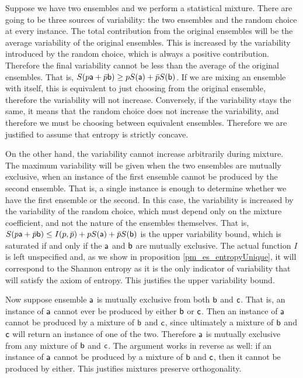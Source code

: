 \begin{mathSection}
\begin{justification}
	Suppose we have two ensembles and we perform a statistical mixture. There are going to be three sources of variability: the two ensembles and the random choice at every instance. The total contribution from the original ensembles will be the average variability of the original ensembles. This is increased by the variability introduced by the random choice, which is always a positive contribution. Therefore the final variability cannot be less than the average of the original ensembles. That is, $S(p\ens[a] + \bar{p} \ens[b]) \geq p S(\ens[a]) + \bar{p} S(\ens[b])$. If we are mixing an ensemble with itself, this is equivalent to just choosing from the original ensemble, therefore the variability will not increase. Conversely, if the variability stays the same, it means that the random choice does not increase the variability, and therefore we must be choosing between equivalent ensembles. Therefore we are justified to assume that entropy is strictly concave.
	
	On the other hand, the variability cannot increase arbitrarily during mixture. The maximum variability will be given when the two ensembles are mutually exclusive, when an instance of the first ensemble cannot be produced by the second ensemble. That is, a single instance is enough to determine whether we have the first ensemble or the second. In this case, the variability is increased by the variability of the random choice, which must depend only on the mixture coefficient, and not the nature of the ensembles themselves. That is, $S(p\ens[a] + \bar{p} \ens[b]) \leq I(p, \bar{p}) + p S(\ens[a]) + \bar{p} S(\ens[b])$ is the upper variability bound, which is saturated if and only if the $\ens[a]$ and $\ens[b]$ are mutually exclusive. The actual function $I$ is left unspecified and, as we show in proposition \ref{pm_es_entropyUnique}, it will correspond to the Shannon entropy as it is the only indicator of variability that will satisfy the axiom of entropy. This justifies the upper variability bound.
	
	Now suppose ensemble $\ens[a]$ is mutually exclusive from both $\ens[b]$ and $\ens[c]$. That is, an instance of $\ens[a]$ cannot ever be produced by either $\ens[b]$ or $\ens[c]$. Then an instance of $\ens[a]$ cannot be produced by a mixture of $\ens[b]$ and $\ens[c]$, since ultimately a mixture of $\ens[b]$ and $\ens[c]$ will return an instance of one of the two. Therefore $\ens[a]$ is mutually exclusive from any mixture of $\ens[b]$ and $\ens[c]$. The argument works in reverse as well: if an instance of $\ens[a]$ cannot be produced by a mixture of $\ens[b]$ and $\ens[c]$, then it cannot be produced by either. This justifies mixtures preserve orthogonality.
\end{justification}
\end{mathSection}

